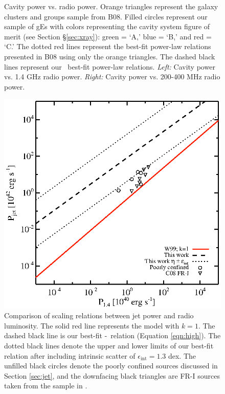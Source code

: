 \documentclass[12pt, preprint]{aastex}
\begin{document}
\begin{center}
\begin{figure}[htp]
\begin{minipage}[htp]{0.5\linewidth}
    \end{minipage}
    \caption{Cavity power vs. radio power. Orange triangles represent
      the galaxy clusters and groups sample from B08. Filled circles
      represent our sample of gEs with colors representing the cavity
      system figure of merit (see Section \S\ref{sec:xray}): green =
      `A,' blue = `B,' and red = `C.' The dotted red lines represent
      the best-fit power-law relations presented in B08 using only the
      orange triangles. The dashed black lines represent our
      \bces\ best-fit power-law relations. {\it{Left:}} Cavity power
      vs. 1.4 GHz radio power. {\it{Right:}} Cavity power vs. 200-400
      MHz radio power.}
    \label{fig:pcav}
  \end{figure}
\end{center}

\begin{figure}[htp]
  \begin{center}
    \begin{minipage}[htp]{0.5\linewidth}
      \includegraphics*[width=\textwidth, trim=30mm 5mm 40mm 15mm, clip]{f2.eps}
      \caption{Comparison of scaling relations between jet power and
        radio luminosity. The solid red line represents the
        \citet[][W99]{w99} model with $k=1$. The dashed black line is
        our best-fit \pjet-\phigh\ relation (Equation
        \ref{eqn:high}). The dotted black lines denote the upper and
        lower limits of our best-fit relation after including
        intrinsic scatter of $\epsilon_{\mathrm{int}} = 1.3$ dex. The
        unfilled black circles denote the poorly confined sources
        discussed in Section \ref{sec:jet}, and the downfacing black
        triangles are FR-I sources taken from the sample in
        \citet[][C08]{2008MNRAS.386.1709C}.}
      \label{fig:radeff}
    \end{minipage}
  \end{center}
\end{figure}
\end{document}
